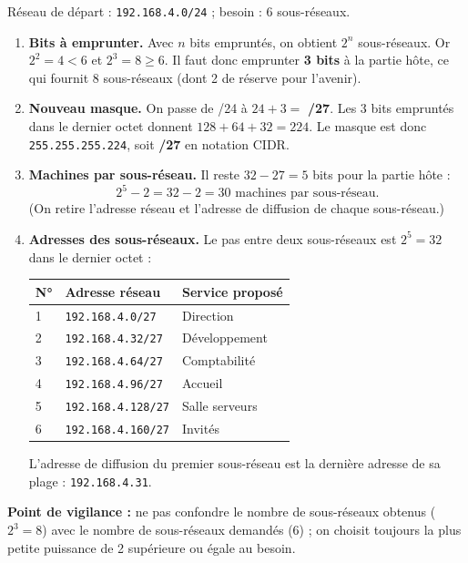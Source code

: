 \documentclass[11pt]{article}
\newcommand{\cle}[1]{{\popxbold\color{popdark}#1}}
\begin{document}
\begin{corrige}
Réseau de départ : \texttt{192.168.4.0/24} ; besoin : 6 sous-réseaux.
\begin{enumerate}
\item \textbf{Bits à emprunter.} Avec $n$ bits empruntés, on obtient $2^n$ sous-réseaux. Or $2^2 = 4 < 6$ et $2^3 = 8 \geq 6$. Il faut donc emprunter \textbf{3 bits} à la partie hôte, ce qui fournit 8 sous-réseaux (dont 2 de réserve pour l'avenir).
\item \textbf{Nouveau masque.} On passe de /24 à $24 + 3 = $ \textbf{/27}. Les 3 bits empruntés dans le dernier octet donnent $128 + 64 + 32 = 224$. Le masque est donc \texttt{255.255.255.224}, soit \textbf{/27} en notation \cle{CIDR}.
\item \textbf{Machines par sous-réseau.} Il reste $32 - 27 = 5$ bits pour la partie hôte :
\[ 2^5 - 2 = 32 - 2 = 30 \text{ machines par sous-réseau.} \]
(On retire l'adresse réseau et l'adresse de diffusion de chaque sous-réseau.)
\item \textbf{Adresses des sous-réseaux.} Le pas entre deux sous-réseaux est $2^5 = 32$ dans le dernier octet :
\begin{center}
\begin{tabularx}{\linewidth}{|l|l|X|}
\hline
\rowcolor{popblueL} \textbf{N°} & \textbf{Adresse réseau} & \textbf{Service proposé} \\
\hline
1 & \texttt{192.168.4.0/27} & Direction \\
\hline
2 & \texttt{192.168.4.32/27} & Développement \\
\hline
3 & \texttt{192.168.4.64/27} & Comptabilité \\
\hline
4 & \texttt{192.168.4.96/27} & Accueil \\
\hline
5 & \texttt{192.168.4.128/27} & Salle serveurs \\
\hline
6 & \texttt{192.168.4.160/27} & Invités \\
\hline
\end{tabularx}
\end{center}
L'adresse de diffusion du premier sous-réseau est la dernière adresse de sa plage : \texttt{192.168.4.31}.
\end{enumerate}
\textbf{Point de vigilance :} ne pas confondre le nombre de sous-réseaux obtenus ($2^3 = 8$) avec le nombre de sous-réseaux demandés (6) ; on choisit toujours la plus petite puissance de 2 supérieure ou égale au besoin.
\end{corrige}
\end{document}
